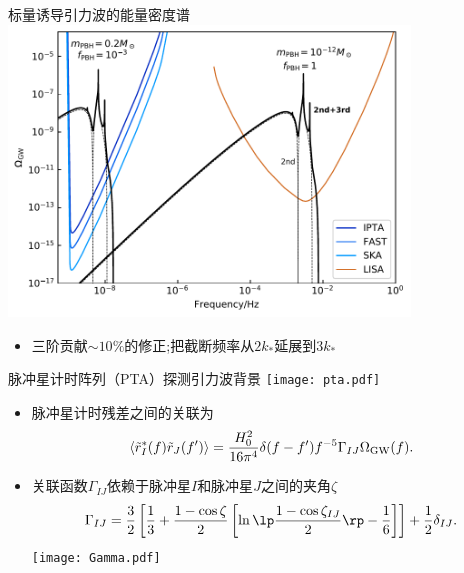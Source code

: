\documentclass[xcolor={svgnames},compress]{beamer}
\let\olditem\item
\renewcommand{\item}{%
    \olditem\vspace{\fill}}
\def\e{\begin{equation}}
\def\q{\end{equation}}
\begin{document}
\begin{frame}{标量诱导引力波的能量密度谱}
        \centering
        \includegraphics[width=0.8\textwidth]{pic/OmegaGW.pdf}
        \begin{itemize}
            \item 三阶贡献$\sim10\%$的修正;\qquad 把截断频率从$2k_*$延展到$3k_*$
        \end{itemize}
    \centering
\end{frame}

\begin{frame}{脉冲星计时阵列（PTA）探测引力波背景}
    \centering
    \texttt{[image: pta.pdf]}
\end{frame}

\begin{frame}{}
    \begin{itemize}
        \item 脉冲星计时残差之间的关联为
        {\small
        \e
        \langle\tilde{r}_I^*(f)\tilde{r}_J(f')\rangle
        = \frac{H_0^2}{16 \pi^4} \delta(f-f') f^{-5}
        \Gamma_{IJ} \Omega_{\rm GW}(f) .
        \q}
        \item 关联函数$\Gamma_{IJ}$依赖于脉冲星$I$和脉冲星$J$之间的夹角$\zeta$
        {\small\[
        \Gamma_{IJ}=\frac{3}{2} \left[ \frac{1}{3} +
        \frac{1-\cos\zeta}{2}\left[ \ln\lp\frac{1-\cos\zeta_{IJ}}{2}\rp
        - \frac{1}{6} \right] \right] +\frac{1}{2}\delta_{IJ}.
        \]}
        \centering
        \texttt{[image: Gamma.pdf]}
    \end{itemize}
\end{frame}
\end{document}
